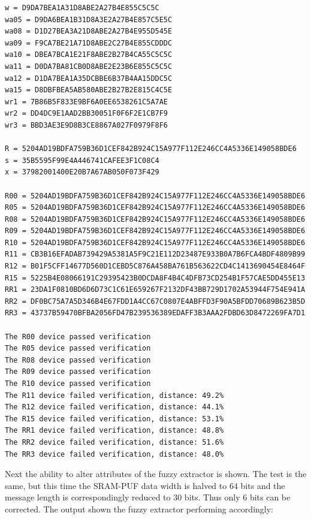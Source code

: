 \begin{verbatim}
w = D9DA7BEA1A31D8ABE2A27B4E855C5C5C
wa05 = D9DA6BEA1B31D8A3E2A27B4E857C5E5C
wa08 = D1D27BEA3A21D8ABE2A27B4E955D545E
wa09 = F9CA7BE21A71D8ABE2C27B4E855CDDDC
wa10 = DBEA7BCA1E21F8ABE2B27B4CA55C5C5C
wa11 = D0DA7BA81CB0D8ABE2E23B6E855C5C5C
wa12 = D1DA7BEA1A35DCBBE6B37B4AA15DDC5C
wa15 = D8DBFBEA5AB580ABE2B27B2E815C4C5E
wr1 = 7B86B5F833E9BF6A0EE6538261C5A7AE
wr2 = DD4DC9E1AAD2BB30051F0F6F2E1CB7F9
wr3 = BBD3AE3E9D8B3CE8867A027F0979F8F6

R = 5204AD19BDFA759B36D1CEF842B924C15A977F112E246CC4A5336E149058BDE6
s = 35B5595F99E4A446741CAFEE3F1C08C4
x = 37982001400E20B7A67AB050F073F429

R00 = 5204AD19BDFA759B36D1CEF842B924C15A977F112E246CC4A5336E149058BDE6
R05 = 5204AD19BDFA759B36D1CEF842B924C15A977F112E246CC4A5336E149058BDE6
R08 = 5204AD19BDFA759B36D1CEF842B924C15A977F112E246CC4A5336E149058BDE6
R09 = 5204AD19BDFA759B36D1CEF842B924C15A977F112E246CC4A5336E149058BDE6
R10 = 5204AD19BDFA759B36D1CEF842B924C15A977F112E246CC4A5336E149058BDE6
R11 = CB3B16EFADAB739429A5381A5F9C21E112D23487E933B0A7B6FCA4BDF4809B99
R12 = B01F5CFF14677D560D1CEBD5C876A458BA761B563622CD4C1413690454E8464F
R15 = 5225B4E08066191C29395423B0DCDA8F4B4C4DFB73CD254B1F57CAE5DD455E13
RR1 = 23DA1F0810BD6D6D73C1C61E659267F2132DF43BB729D1702A53944F754E941A
RR2 = DF0BC75A7A5D346B4E67FDD1A4CC67C0807E4ABFFD3F90A5BFDD70689B623B5D
RR3 = 43737B59470BFBA2056FD47B239536389EDAFF3B3AAA2FDBD63D8472269FA7D1

The R00 device passed verification
The R05 device passed verification
The R08 device passed verification
The R09 device passed verification
The R10 device passed verification
The R11 device failed verification, distance: 49.2%
The R12 device failed verification, distance: 44.1%
The R15 device failed verification, distance: 53.1%
The RR1 device failed verification, distance: 48.8%
The RR2 device failed verification, distance: 51.6%
The RR3 device failed verification, distance: 48.0%
\end{verbatim}

Next the ability to alter attributes of the fuzzy extractor is shown. The test
is the same, but this time the SRAM-PUF data width is halved to 64 bits and the
message length is correspondingly reduced to 30 bits. Thus only 6 bits can be
corrected. The output shown the fuzzy extractor performing accordingly:

